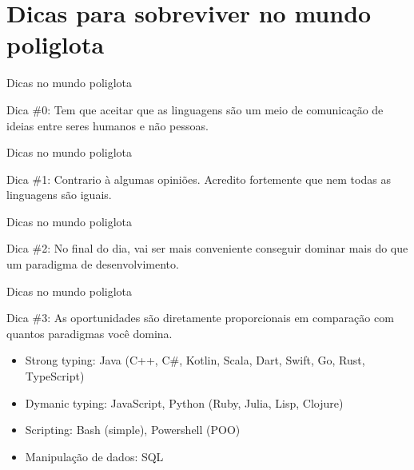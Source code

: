 \documentclass[aspectratio=169]{beamer}
\begin{document}
\section{Dicas para sobreviver no mundo poliglota}

\begin{frame}{Dicas no mundo poliglota}

	\begin{exampleblock}{Dica \#0:}
    Tem que aceitar que as linguagens são um meio de comunicação de ideias entre seres humanos e não pessoas.
	\end{exampleblock}
\end{frame}


\begin{frame}{Dicas no mundo poliglota}

	\begin{exampleblock}{Dica \#1:}
    Contrario à algumas opiniões. Acredito fortemente que nem todas as linguagens são iguais.
	\end{exampleblock}
\end{frame}

\begin{frame}{Dicas no mundo poliglota}

	\begin{exampleblock}{Dica \#2:}
    No final do dia, vai ser mais conveniente conseguir dominar mais do que um paradigma de desenvolvimento.
	\end{exampleblock}
\end{frame}

\begin{frame}{Dicas no mundo poliglota}

	\begin{exampleblock}{Dica \#3:}
    As oportunidades são diretamente proporcionais em comparação com quantos paradigmas você domina.
    \begin{itemize}
    	\item Strong typing: Java (C++, C\#, Kotlin, Scala, Dart, Swift, Go, Rust, TypeScript)
        \item Dymanic typing: JavaScript, Python (Ruby, Julia, Lisp, Clojure)
        \item Scripting: Bash (simple), Powershell (POO)
        \item Manipulação de dados: SQL
   	\end{itemize}

	\end{exampleblock}
\end{frame}
\end{document}
